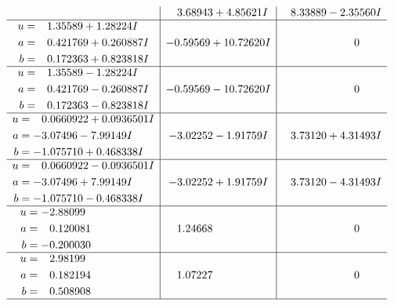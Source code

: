 \documentclass[1p]{elsarticle_modified}
\theoremstyle{definition}
\begin{document}
$$\begin{array}{c|c|c}
 & \phantom{-}3.68943 + 4.85621 I & \phantom{-}8.33889 - 2.35560 I \\ \hline\begin{aligned}
u &= \phantom{-}1.35589 + 1.28224 I \\
a &= \phantom{-}0.421769 + 0.260887 I \\
b &= \phantom{-}0.172363 + 0.823818 I\end{aligned}
 & -0.59569 + 10.72620 I & \phantom{-0.000000 } 0 \\ \hline\begin{aligned}
u &= \phantom{-}1.35589 - 1.28224 I \\
a &= \phantom{-}0.421769 - 0.260887 I \\
b &= \phantom{-}0.172363 - 0.823818 I\end{aligned}
 & -0.59569 - 10.72620 I & \phantom{-0.000000 } 0 \\ \hline\begin{aligned}
u &= \phantom{-}0.0660922 + 0.0936501 I \\
a &= -3.07496 - 7.99149 I \\
b &= -1.075710 + 0.468338 I\end{aligned}
 & -3.02252 - 1.91759 I & \phantom{-}3.73120 + 4.31493 I \\ \hline\begin{aligned}
u &= \phantom{-}0.0660922 - 0.0936501 I \\
a &= -3.07496 + 7.99149 I \\
b &= -1.075710 - 0.468338 I\end{aligned}
 & -3.02252 + 1.91759 I & \phantom{-}3.73120 - 4.31493 I \\ \hline\begin{aligned}
u &= -2.88099\phantom{ +0.000000I} \\
a &= \phantom{-}0.120081\phantom{ +0.000000I} \\
b &= -0.200030\phantom{ +0.000000I}\end{aligned}
 & \phantom{-}1.24668\phantom{ +0.000000I} & \phantom{-0.000000 } 0 \\ \hline\begin{aligned}
u &= \phantom{-}2.98199\phantom{ +0.000000I} \\
a &= \phantom{-}0.182194\phantom{ +0.000000I} \\
b &= \phantom{-}0.508908\phantom{ +0.000000I}\end{aligned}
 & \phantom{-}1.07227\phantom{ +0.000000I} & \phantom{-0.000000 } 0\\
 \hline 
 \end{array}$$\newpage\newpage\renewcommand{\arraystretch}{1}
\end{document}
